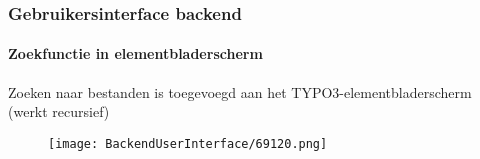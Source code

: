 \begin{frame}[fragile]
	\frametitle{Gebruikersinterface backend}
	\framesubtitle{Zoekfunctie in elementbladerscherm}

	Zoeken naar bestanden is toegevoegd aan het TYPO3-elementbladerscherm (werkt recursief)

	\begin{figure}
		\texttt{[image: BackendUserInterface/69120.png]}
	\end{figure}

\end{frame}

